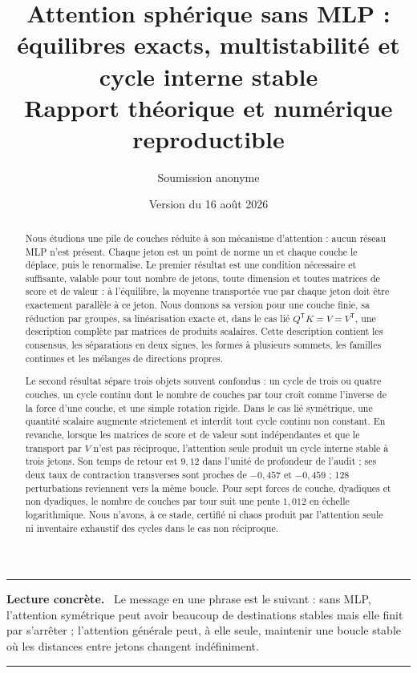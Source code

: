 \documentclass[11pt,a4paper]{article}
\title{\textbf{Attention sphérique sans MLP :\\
équilibres exacts, multistabilité et cycle interne stable}\\[0.5em]
\large Rapport théorique et numérique reproductible}
\author{Soumission anonyme}
\date{Version du 16 août 2026}
\theoremstyle{definition}
\newcommand{\T}{\mathsf T}
\newenvironment{plainbox}
{\begin{center}\begin{minipage}{0.92\textwidth}\color{deepblue}\hrule\vspace{0.45em}\small\textbf{Lecture concrète.}\ \color{black}}
{\vspace{0.35em}\color{deepblue}\hrule\color{black}\end{minipage}\end{center}}
\begin{document}
\maketitle

\begin{abstract}
Nous étudions une pile de couches réduite à son mécanisme d'attention : aucun réseau
MLP n'est présent. Chaque jeton est un point de norme un et chaque couche le déplace,
puis le renormalise. Le premier résultat est une condition nécessaire et suffisante,
valable pour tout nombre de jetons, toute dimension et toutes matrices de score et de
valeur : à l'équilibre, la moyenne transportée vue par chaque jeton doit être exactement
parallèle à ce jeton. Nous donnons sa version pour une couche finie, sa réduction par
groupes, sa linéarisation exacte et, dans le cas lié
$Q^{\T}K=V=V^{\T}$, une description complète par matrices de produits scalaires.
Cette description contient les consensus, les séparations en deux signes, les formes à
plusieurs sommets, les familles continues et les mélanges de directions propres.

Le second résultat sépare trois objets souvent confondus : un cycle de trois ou quatre
couches, un cycle continu dont le nombre de couches par tour croît comme l'inverse de
la force d'une couche, et une simple rotation rigide. Dans le cas lié symétrique, une
quantité scalaire augmente strictement et interdit tout cycle continu non constant. En
revanche, lorsque les matrices de score et de valeur sont indépendantes et que le
transport par $V$ n'est pas réciproque, l'attention seule produit un cycle interne stable
à trois jetons. Son temps de retour est $9{,}12$ dans l'unité de profondeur de l'audit ;
ses deux taux de contraction transverses sont proches de $-0{,}457$ et $-0{,}459$ ;
128 perturbations reviennent vers la même boucle. Pour sept forces de couche, dyadiques
et non dyadiques, le nombre de couches par tour suit une pente $1{,}012$ en échelle
logarithmique. Nous n'avons, à ce stade, certifié ni chaos produit par l'attention seule
ni inventaire exhaustif des cycles dans le cas non réciproque.
\end{abstract}

\begin{plainbox}
Le message en une phrase est le suivant : sans MLP, l'attention symétrique peut avoir
beaucoup de destinations stables mais elle finit par s'arrêter ; l'attention générale
peut, à elle seule, maintenir une boucle stable où les distances entre jetons changent
indéfiniment.
\end{plainbox}
\end{document}
